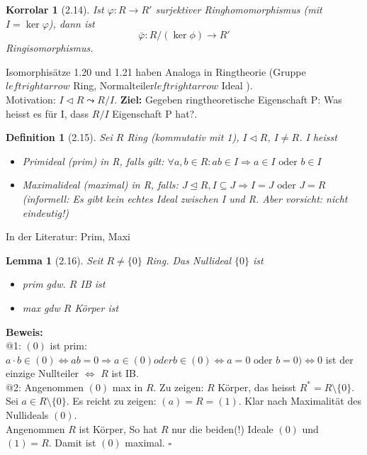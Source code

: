 \documentclass[10pt,a4paper]{article}
\newtheorem{defi}{Definition}
\newtheorem{korr}{Korrolar}
\newtheorem{lemma}{Lemma}
\begin{document}
\begin{korr}[2.14]
 Ist $\varphi : R \rightarrow R'$ surjektiver Ringhomomorphismus (mit $I = \ker \varphi$), dann ist 
 $$\bar \varphi : R/(\ker \phi) \rightarrow R'$$
 Ringisomorphismus.
\end{korr}
Isomorphisätze 1.20 und 1.21 haben Analoga in Ringtheorie (\glqq Gruppe\grqq $leftrightarrow$ \glqq Ring\grqq , \glqq Normalteiler\grqq $leftrightarrow$ \glqq Ideal \grqq ).\\
\medskip
Motivation: $I \triangleleft R \leadsto R/I$. \textbf{Ziel:} Gegeben ringtheoretische Eigenschaft P: \glqq Was heisst es für I, dass $R/I$ Eigenschaft P hat?\grqq .\\
\begin{defi}[2.15]
 Sei $R$ Ring (kommutativ mit 1), $I \triangleleft R$, $I \neq R$. I heisst
 \begin{itemize}
  \item Primideal (prim) in R, falls gilt: $\forall a,b \in R: ab \in I \Rightarrow a \in I \textrm{ oder } b \in I$
  \item Maximalideal (maximal) in R, falls: $J \trianglelefteq R, I \subseteq J \Rightarrow I = J \textrm{ oder } J = R$ (informell: Es gibt kein echtes Ideal zwischen I und R. Aber vorsicht: nicht eindeutig!)
 \end{itemize}
\end{defi}
In der Literatur:  Prim,  Maxi
\begin{lemma}[2.16]
 Seit $R \neq \lbrace 0 \rbrace$ Ring. Das Nullideal $\lbrace 0 \rbrace$ ist
 \begin{itemize}
  \item prim gdw. $R$ IB ist
  \item max gdw $R$ Körper ist
 \end{itemize}
\end{lemma}
\textbf{Beweis:}\\
@1: $(0)$ ist prim: $a\cdot b \in (0) \Leftrightarrow ab = 0 \Rightarrow a \in (0) oder b \in (0) \Leftrightarrow a = 0 \textrm{ oder } b = 0) \Leftrightarrow 0$ ist der einzige Nullteiler $\Leftrightarrow$ $R$ ist IB.\\
@2: Angenommen $(0)$ max in $R$. Zu zeigen: $R$ Körper, das heisst $R^* = R \setminus \lbrace 0 \rbrace$. Sei $a \in R \setminus \lbrace 0 \rbrace$. Es reicht zu zeigen: $(a) = R = (1)$. Klar nach Maximalität des Nullideals $(0)$.\\
Angenommen $R$ ist Körper, So hat $R$ nur die beiden(!) Ideale $(0)$ und $(1) = R$. Damit ist $(0)$ maximal. $\square$\\
\end{document}
